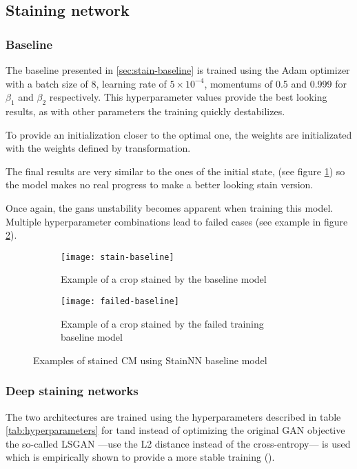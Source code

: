\documentclass[../main.tex]{subfiles}
\begin{document}
\subsection{Staining network}
\subsubsection{Baseline}
The baseline presented in \ref{sec:stain-baseline} is trained using the
Adam optimizer
with a batch size of 8, learning rate of $5 \times 10^{-4}$, momentums of
0.5 and 0.999 for $\beta_1$ and $\beta_2$ respectively. This hyperparameter
values provide the best looking results, as with other parameters the training
quickly destabilizes.

To provide an initialization closer to the optimal one, the weights are
initializated with the weights defined by \cite{Gareau2009} transformation.

The final results are very similar to the ones of the initial state,
(see figure \ref{fig:stain-baseline})
so the model makes no real progress to make a better looking stain version.

Once again, the \gls{gans} unstability becomes apparent when training this model.
Multiple hyperparameter combinations lead to failed cases (see example in figure
\ref{fig:failed-baseline}).

\begin{figure}[p]
\centering
\begin{subfigure}{.5\textwidth}
\centering
\texttt{[image: stain-baseline]}
\caption{Example of a crop stained by the baseline model}
\label{fig:stain-baseline}
\end{subfigure}
\begin{subfigure}{.5\textwidth}
\centering
\texttt{[image: failed-baseline]}
\caption{Example of a crop stained by the failed training baseline model}
\label{fig:failed-baseline}
\end{subfigure}
\caption{Examples of stained CM using StainNN baseline model}
\label{fig:baseline-examples}
\end{figure}

\subsubsection{Deep staining networks}

The two architectures are trained using the hyperparameters described
in table \ref{tab:hyperparameters} 
for tand instead of optimizing the
original GAN objective
the so-called LSGAN ---use the L2 distance instead of the cross-entropy---
is used which is empirically shown to provide a more
stable training (\cite{lsgan}).
\end{document}
